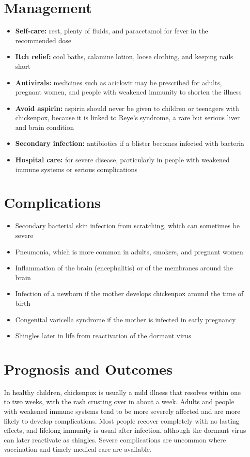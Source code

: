 \section*{Management}
\begin{itemize}
    \item \textbf{Self-care:} rest, plenty of fluids, and paracetamol for fever in the recommended dose
    \item \textbf{Itch relief:} cool baths, calamine lotion, loose clothing, and keeping nails short
    \item \textbf{Antivirals:} medicines such as aciclovir may be prescribed for adults, pregnant women, and people with weakened immunity to shorten the illness
    \item \textbf{Avoid aspirin:} aspirin should never be given to children or teenagers with chickenpox, because it is linked to Reye's syndrome, a rare but serious liver and brain condition
    \item \textbf{Secondary infection:} antibiotics if a blister becomes infected with bacteria
    \item \textbf{Hospital care:} for severe disease, particularly in people with weakened immune systems or serious complications
\end{itemize}

\section*{Complications}
\begin{itemize}
    \item Secondary bacterial skin infection from scratching, which can sometimes be severe
    \item Pneumonia, which is more common in adults, smokers, and pregnant women
    \item Inflammation of the brain (encephalitis) or of the membranes around the brain
    \item Infection of a newborn if the mother develops chickenpox around the time of birth
    \item Congenital varicella syndrome if the mother is infected in early pregnancy
    \item Shingles later in life from reactivation of the dormant virus
\end{itemize}

\section*{Prognosis and Outcomes}
In healthy children, chickenpox is usually a mild illness that resolves within one to two weeks, with the rash crusting over in about a week. Adults and people with weakened immune systems tend to be more severely affected and are more likely to develop complications. Most people recover completely with no lasting effects, and lifelong immunity is usual after infection, although the dormant virus can later reactivate as shingles. Severe complications are uncommon where vaccination and timely medical care are available.

